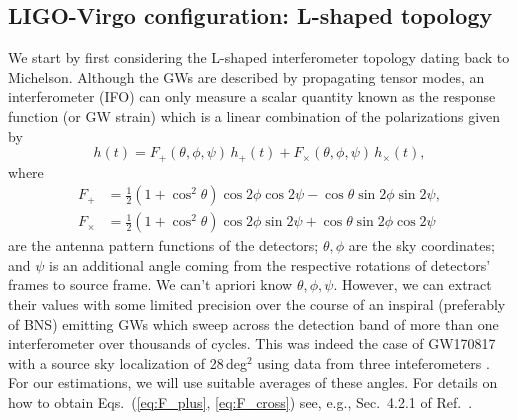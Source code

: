 \documentclass[amsmath,amssymb,aps,floats,amsfonts,notitlepage,superscriptaddress,eqsecnum,nofootinbib,10pt]{revtex4-1}
\newcommand{\f}{\frac}
\newcommand{\be}{\begin{equation}}
\newcommand{\ee}{\end{equation}}
\begin{document}
\subsection{LIGO-Virgo configuration: L-shaped topology}\label{sec:LIGO_topo}
We start by first considering the L-shaped interferometer topology dating back to Michelson.
Although the GWs are described by propagating tensor modes, an interferometer (IFO) can only measure a scalar quantity
known as the response function (or GW strain)
which is a linear combination of the polarizations given by
%
\be
h(t) = F_+(\theta,\phi,\psi) \,h_+(t)+F_\times(\theta,\phi,\psi)\, h_\times(t) , \label{eq:detector_strain}
\ee
%
where
%
\begin{align}
 F_+ &=\f{1}{2}\left(1+\cos^2\theta\right)\cos2\phi\cos 2\psi-\cos\theta \sin2\phi \sin2\psi \label{eq:F_plus},\\
 F_\times &=\f{1}{2}\left(1+\cos^2\theta\right)\cos2\phi\sin2\psi+\cos\theta \sin2\phi \cos2\psi \label{eq:F_cross}
\end{align}
%
are the antenna pattern functions of the detectors; $\theta,\phi$ are the sky coordinates; and $\psi$ is
an additional angle coming from the respective rotations of detectors' frames to source frame. %
%
We can't apriori know $\theta, \phi,\psi$. However, we can extract their values with some limited precision over the course of an inspiral (preferably of BNS) 
emitting GWs which sweep across the detection band of more than one interferometer over thousands of cycles. This was indeed the case of GW170817
with a source sky localization of 28\,deg$^2$ using data from three inteferometers \cite{GW170817}. 
For our estimations, we will use suitable averages of these angles.
For details on how to obtain Eqs.~(\ref{eq:F_plus}, \ref{eq:F_cross}) see, e.g., Sec.~4.2.1 of Ref.~\cite{SchutzLRR}.
\end{document}
